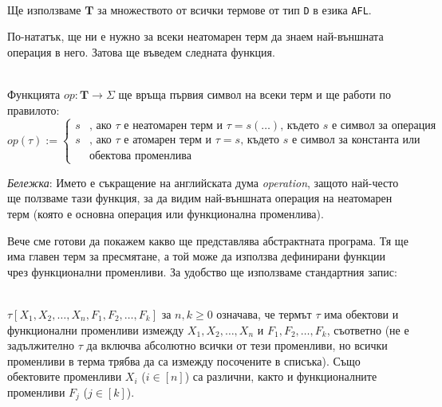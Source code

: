 \documentclass[12pt,twoside,a4paper]{article}
\begin{document}
	\begin{denotation}~\\
		\indent Ще използваме $\mathbf{T}$ за множеството от всички термове от тип \texttt{D} в езика \texttt{AFL}.
	\end{denotation}
	
	По-нататък, ще ни е нужно за всеки неатомарен терм да знаем най-външната операция в него. Затова ще въведем следната функция.
	
	\newpage
	\begin{definition}[функцията $op$]\label{def:op}~\\
		\indent Функцията $op \colon \mathbf{T} \to \Sigma$ ще връща първия символ на всеки терм и ще работи по правилото:
		\begin{equation*}
			op(\tau) := 
			\begin{cases}
				s &\text{, ако }\tau\text{ е неатомарен терм и }\tau = s(\dots)\text{, където }s\text{ е символ за операция}\\
				s &\text{, ако }\tau\text{ е атомарен терм и }\tau = s\text{, където }s\text{ е символ за константа или}\\
				&\text{обектова променлива}
			\end{cases}
		\end{equation*}
		
		\textit{Бележка}: Името е съкращение на английската дума \textit{operation}, защото най-често ще ползваме тази функция, за да видим най-външната операция на неатомарен терм (която е основна операция или функционална променлива).
	\end{definition}
	
	Вече сме готови да покажем какво ще представлява абстрактната програма. Тя ще има главен терм за пресмятане, а той може да използва дефинирани функции чрез функционални променливи. За удобство ще използваме стандартния запис:
	\begin{denotation}~\\
		\indent $\tau[X_1, X_2, \dots, X_n, F_1, F_2, \dots, F_k]$ за $n, k \ge 0$ означава, че термът $\tau$ има обектови и функционални променливи измежду $X_1, X_2, \dots, X_n$ и $F_1, F_2, \dots, F_k$, съответно (не е задължително $\tau$ да включва абсолютно всички от тези променливи, но всички променливи в терма трябва да са измежду посочените в списъка). Също обектовите променливи $X_i$ ($i \in [n]$) са различни, както и функционалните променливи $F_j$ ($j \in [k]$).
	\end{denotation}
	
\end{document}
